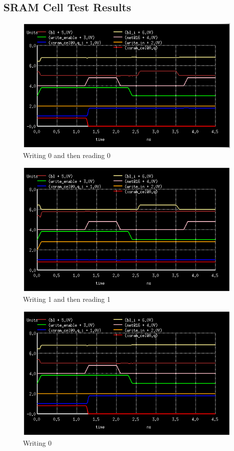 \documentclass[12pt]{report}
\begin{document}
\subsection*{SRAM Cell Test Results}
\begin{figure}[H]
  \centering
    \includegraphics[width=1.0\textwidth]{write_0_then_read_0.png}
  \caption{Writing 0 and then reading 0}
  \label{fig:write_0_then_read_0}
\end{figure}

\begin{figure}[H]
  \centering
    \includegraphics[width=1.0\textwidth]{write_1_then_read_1.png}
  \caption{Writing 1 and then reading 1}
  \label{fig:write_1_then_read_1}
\end{figure}

\begin{figure}[H]
  \centering
    \includegraphics[width=1.0\textwidth]{write_1_then_write_0.png}
  \caption{Writing 0}
  \label{fig:write_1_then_write_0}
\end{figure}
\end{document}
